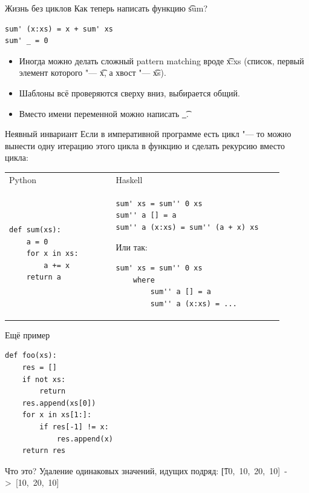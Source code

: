 \begin{frame}[t,fragile]{Жизнь без циклов}
	Как теперь написать функцию \t{sum}? \pause
\begin{verbatim}
sum' (x:xs) = x + sum' xs
sum' _ = 0
\end{verbatim}
	\begin{itemize}
		\item Иногда можно делать сложный pattern matching вроде \t{x:xs} (список, первый элемент которого "--- \t{x}, а хвост "--- \t{xs}).
		\item Шаблоны всё проверяются сверху вниз, выбирается общий.
		\item Вместо имени переменной можно написать \t{\_}.
	\end{itemize}
\end{frame}

\begin{frame}[fragile]{Неявный инвариант}
	Если в императивной программе есть цикл "--- то можно вынести одну итерацию этого цикла в функцию и сделать рекурсию вместо цикла:

	\begin{tabular}{p{0.35\linewidth}p{0.55\linewidth}}
		\centering
		Python & Haskell \\
\begin{verbatim}
def sum(xs):
    a = 0
    for x in xs:
        a += x
    return a
\end{verbatim}
		&
\begin{verbatim}
sum' xs = sum'' 0 xs
sum'' a [] = a
sum'' a (x:xs) = sum'' (a + x) xs
\end{verbatim}
\pause
Или так:
\begin{verbatim}
sum' xs = sum'' 0 xs
    where
        sum'' a [] = a
        sum'' a (x:xs) = ...
\end{verbatim}
	\end{tabular}
\end{frame}

\begin{frame}[t, fragile]{Ещё пример}
\begin{verbatim}
def foo(xs):
    res = []
    if not xs:
        return
    res.append(xs[0])
    for x in xs[1:]:
        if res[-1] != x:
            res.append(x)
    return res
\end{verbatim}
	Что это?
	\pause
	Удаление одинаковых значений, идущих подряд: \t{[10,~10,~20,~10]~->~[10,~20,~10]}
\end{frame}

